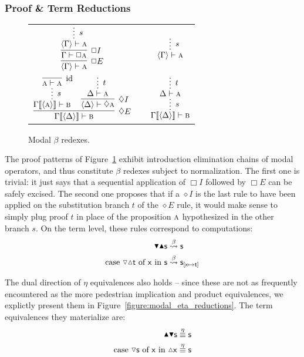 \subsubsection{Proof \& Term Reductions}
\begin{figure}
	\centering
		\begin{tabularx}{0.85\textwidth}{@{}ccc@{}}
		$\infer[\Box E]{\bracket{\Gamma} \vdash \prop{A}}{
			\infer[\Box I]{\Gamma \vdash \Box \prop{A}}{
				\infer*[s]{\bracket{\Gamma} \vdash  \prop{A}}{}
			}
		}
		$
		&
		\raisebox{10pt}{$\implies$}
		&
		$\infer*[s]{\bracket{\Gamma} \vdash \prop{A}}{}
		$\\[\smallsep]
		$\infer[\diamond E]{\Gamma\ctx{\bracket{\Delta}} \vdash \prop{B}}{
			\infer*[s]{\Gamma\ctx{\bracket{\prop{A}}} \vdash \prop{B}}{
				\infer[\Ax]{\prop{A} \vdash \prop{A}}{}}
			&
			\infer[\diamond I]{\bracket{\Delta} \vdash \diamond\prop{A}}{
				\infer*[t]{\Delta \vdash \prop{A}}{}
			}
		}
		$
		&
		\raisebox{20pt}{$\implies$}
		&
		$\infer*[s]{\Gamma\ctx{\bracket{\Delta}} \vdash \prop{B}}{
			\infer*[t]{\Delta \vdash \prop{A}}{}
		}
		$
		\end{tabularx}
		\caption{Modal $\beta$ redexes.}
		\label{figure:modal_beta_reductions}
\end{figure}

The proof patterns of Figure~\ref{figure:modal_beta_reductions} exhibit introduction elimination chains of modal operators, and thus constitute $\beta$ redexes subject to normalization.
The first one is trivial: it just says that a sequential application of $\Box I$ followed by $\Box E$ can be safely excised.
The second one proposes that if a $\diamond I$ is the last rule to have been applied on the substitution branch $t$ of the $\diamond E$ rule, it would make sense to simply plug proof $t$ in place of the proposition $\smallprop{A}$ hypothesized in the other  branch $s$.
On the term level, these rules correspond to computations:
\begin{align*}
\boxelim \boxintro \term{s} & \overset{\beta}{\leadsto} \term{s}\\
\cterm{case \term{\diaelim \diaintro t} of \term{x} in \term{s}} & \overset{\beta}{\leadsto} \term{s}_{[\term{x} \mapsto \term{t}]}
\end{align*}

The dual direction of $\eta$ equivalences also holds -- since these are not as frequently encountered as the more pedestrian implication and product equivalences, we explictly present them in Figure~\ref{figure:modal_eta_reductions}.
The term equivalences they materialize are:
\begin{align*}
\boxintro \boxelim \term{s} & \overset{\eta}{\equiv} \term{s}\\
\cterm{case \term{\diaelim{s}} of \term{x} in \term{\diaintro{x}}} & \overset{\eta}{\equiv} \term{s}
\end{align*}

